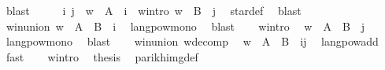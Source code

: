 \begin{isabellebody}
\ blast\isanewline
\ \ \isamarkupfalse%
\ \isamarkupfalse%
\ i\ j\ \ {\isachardoublequoteopen}w{}\ {\isasymin}\ A\ {\isacharcircum}{\kern0pt}{\isacharcircum}{\kern0pt}\ i{\isachardoublequoteclose}\ \ w{}{\isacharunderscore}{\kern0pt}intro{\isacharcolon}{\kern0pt}\ {\isachardoublequoteopen}w{}\ {\isasymin}\ B\ {\isacharcircum}{\kern0pt}{\isacharcircum}{\kern0pt}\ j{\isachardoublequoteclose}\ \isamarkupfalse%
\ star{\isacharunderscore}{\kern0pt}def\ \isamarkupfalse%
\ blast\isanewline
\ \ \isamarkupfalse%
\ \isamarkupfalse%
\ w{}{\isacharunderscore}{\kern0pt}in{\isacharunderscore}{\kern0pt}union{\isacharcolon}{\kern0pt}\ {\isachardoublequoteopen}w{}\ {\isasymin}\ {\isacharparenleft}{\kern0pt}A\ {\isasymunion}\ B{\isacharparenright}{\kern0pt}\ {\isacharcircum}{\kern0pt}{\isacharcircum}{\kern0pt}\ i{\isachardoublequoteclose}\ \isamarkupfalse%
\ langpow{\isacharunderscore}{\kern0pt}mono\ \isamarkupfalse%
\ blast\isanewline
\ \ \isamarkupfalse%
\ w{}{\isacharunderscore}{\kern0pt}intro\ \isamarkupfalse%
\ {\isachardoublequoteopen}w{}\ {\isasymin}\ {\isacharparenleft}{\kern0pt}A\ {\isasymunion}\ B{\isacharparenright}{\kern0pt}\ {\isacharcircum}{\kern0pt}{\isacharcircum}{\kern0pt}\ j{\isachardoublequoteclose}\ \isamarkupfalse%
\ langpow{\isacharunderscore}{\kern0pt}mono\ \isamarkupfalse%
\ blast\isanewline
\ \ \isamarkupfalse%
\ w{}{\isacharunderscore}{\kern0pt}in{\isacharunderscore}{\kern0pt}union\ w{\isacharunderscore}{\kern0pt}decomp\ \isamarkupfalse%
\ {\isachardoublequoteopen}w\ {\isasymin}\ {\isacharparenleft}{\kern0pt}A\ {\isasymunion}\ B{\isacharparenright}{\kern0pt}\ {\isacharcircum}{\kern0pt}{\isacharcircum}{\kern0pt}\ {\isacharparenleft}{\kern0pt}i{\isacharplus}{\kern0pt}j{\isacharparenright}{\kern0pt}{\isachardoublequoteclose}\ \isamarkupfalse%
\ lang{\isacharunderscore}{\kern0pt}pow{\isacharunderscore}{\kern0pt}add\ \isamarkupfalse%
\ fast\isanewline
\ \ \isamarkupfalse%
\ w{\isacharunderscore}{\kern0pt}intro\ \isamarkupfalse%
\ {\isacharquery}{\kern0pt}thesis\ \isamarkupfalse%
\ parikh{\isacharunderscore}{\kern0pt}img{\isacharunderscore}{\kern0pt}def\ \isamarkupfalse%

\end{isabellebody}
